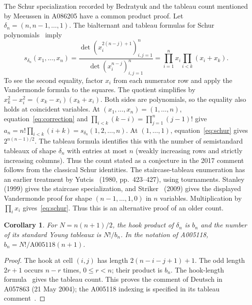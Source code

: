 \documentclass[11pt]{article}
\newtheorem{corollary}[theorem]{Corollary}
\begin{document}
The Schur specialization recorded by Bedratyuk and the tableau count mentioned
by Meeussen in A086205 have a common product proof. Let
$\delta_n=(n,n-1,\ldots,1)$. The bialternant and tableau formulas for Schur
polynomials~\cite[equations (1) and (3)]{tamvakis} imply
\begin{equation}\label{eq:schur}
 s_{\delta_n}(x_1,\ldots,x_n)
 =\frac{\det(x_i^{2(n-j)+1})_{i,j=1}^n}
        {\det(x_i^{n-j})_{i,j=1}^n}
 =\prod_{i=1}^n x_i\prod_{i<k}(x_i+x_k).
\end{equation}
To see the second equality, factor $x_i$ from each numerator row and apply
the Vandermonde formula to the squares. The quotient simplifies by
$x_k^2-x_i^2=(x_k-x_i)(x_k+x_i)$. Both sides are polynomials,
so the equality also holds at coincident variables.
At $(x_1,\ldots,x_n)=(1,\ldots,n)$, equation~\eqref{eq:correction} and
$\prod_{i<k}(k-i)=\prod_{j=1}^n(j-1)!$ give
$a_n=n!\prod_{i<k}(i+k)=s_{\delta_n}(1,2,\ldots,n)$.
At $(1,\ldots,1)$, equation~\eqref{eq:schur} gives $2^{n(n-1)/2}$.
The tableau formula identifies this with the number of semistandard tableaux
of shape $\delta_n$ with entries at most $n$ (weakly increasing rows and
strictly increasing columns). Thus the count stated as a conjecture in the
2017 comment follows from the classical Schur identities.
The staircase-tableau enumeration has an earlier treatment by
Yutcis~\cite{yutcis} (1980, pp.~423--427), using tournaments.
Stanley~\cite[Exercise 7.30(b), solution p.~505]{stanley} (1999)
gives the staircase specialization, and Striker~\cite[Lemma 3.6, p.~820]{striker}
(2009) gives the displayed Vandermonde proof for shape
$(n-1,\ldots,1,0)$ in $n$ variables. Multiplication by $\prod_i x_i$
gives~\eqref{eq:schur}. Thus this is an alternative proof of an older count.

\begin{corollary}\label{cor:hooks}
For $N=n(n+1)/2$, the hook product of $\delta_n$ is $b_n$ and the number
of its standard Young tableaux is $N!/b_n$. In the notation of A005118,
$b_n=N!/\mathrm{A005118}(n+1)$.
\end{corollary}
\begin{proof}
The hook at cell $(i,j)$ has length $2(n-i-j+1)+1$.
The odd length $2r+1$ occurs $n-r$ times, $0\le r<n$; their product is
$b_n$. The hook-length formula~\cite[\S1.2, (HLF)]{hooks} gives the tableau
count. This proves the comment of Deutsch in A057863 (21 May 2004);
the A005118 indexing is specified in its tableau comment~\cite{standard}.
\end{proof}
\end{document}
